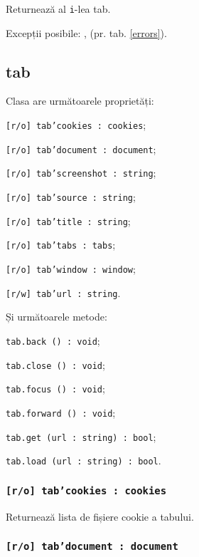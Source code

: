 Returnează al \texttt{i}-lea tab.

Excepții posibile: ,  (pr. tab. \ref{errors}).

\subsection{tab}

Clasa \tab{} are următoarele proprietăți:
\begin{icItems}
	\item \texttt{[r/o] tab'cookies : cookies};
	\item \texttt{[r/o] tab'document : document};
	\item \texttt{[r/o] tab'screenshot : string};
	\item \texttt{[r/o] tab'source : string};
	\item \texttt{[r/o] tab'title : string};
	\item \texttt{[r/o] tab'tabs : tabs};
	\item \texttt{[r/o] tab'window : window};
	\item \texttt{[r/w] tab'url : string}.
\end{icItems}

Și următoarele metode:
\begin{icItems}
	\item \texttt{tab.back () : void};
	\item \texttt{tab.close () : void};
	\item \texttt{tab.focus () : void};
	\item \texttt{tab.forward () : void};
	\item \texttt{tab.get (url : string) : bool};
	\item \texttt{tab.load (url : string) : bool}.
\end{icItems}

\subsubsection{\texttt{[r/o] tab'cookies : cookies}}

Returnează lista de fișiere cookie a tabului.

\subsubsection{\texttt{[r/o] tab'document : document}}

